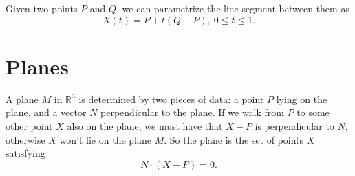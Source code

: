 \documentclass{article}
\begin{document}
Given two points $P$ and $Q$, we can parametrize the line segment 
between them as 
\[X(t) = P + t(Q-P),\ 0 \leq t \leq 1.\]

\section*{Planes}

A plane $M$ in $\mathbb{R}^3$ is determined by two pieces of data: 
a point $P$ lying on the plane, and a vector $N$ perpendicular
to the plane. If we walk from $P$ to some other point $X$ also on the plane,
we must have that $X-P$ is perpendicular to $N$, otherwise $X$ won't lie
on the plane $M$. So the plane is the set of points $X$ satisfying
\[N \cdot (X-P) = 0.\]
\end{document}
